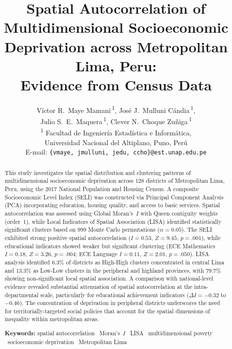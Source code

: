 \documentclass[12pt,a4paper,twoside]{article}
\title{\textbf{Spatial Autocorrelation of Multidimensional Socioeconomic\\Deprivation across Metropolitan Lima, Peru:\\Evidence from Census Data}}
\author{%
  V\'ictor R.\ Maye Mamani\,\textsuperscript{1},
  Jos\'e J.\ Mulluni C\'andia\,\textsuperscript{1},\\[2pt]
  Julio S.\ E.\ Maquera\,\textsuperscript{1},
  Clever N.\ Choque Zu\~niga\,\textsuperscript{1} \\[6pt]
  \small \textsuperscript{1} Facultad de Ingenier\'ia Estad\'istica e Inform\'atica,\\
  \small Universidad Nacional del Altiplano, Puno, Per\'u \\[4pt]
  \small E-mail: \texttt{\{vmaye, jmulluni, jedu, ccho\}@est.unap.edu.pe}
}
\date{}
\begin{document}
\maketitle

\begin{abstract}
\noindent
This study investigates the spatial distribution and clustering patterns of
multidimensional socioeconomic deprivation across 128 districts of Metropolitan
Lima, Peru, using the 2017 National Population and Housing Census. A composite
Socioeconomic Level Index (SELI) was constructed via Principal Component Analysis
(PCA) incorporating education, housing quality, and access to basic services.
Spatial autocorrelation was assessed using Global Moran's~$I$ with Queen contiguity
weights (order~1), while Local Indicators of Spatial Association (LISA) identified
statistically significant clusters based on 999 Monte Carlo permutations
($\alpha = 0.05$). The SELI exhibited strong positive spatial autocorrelation
($I = 0.53$, $Z = 9.45$, $p = .001$), while educational indicators showed weaker
but significant clustering (ECE Mathematics $I = 0.18$, $Z = 3.26$, $p = .004$;
ECE Language $I = 0.11$, $Z = 2.01$, $p = .050$). LISA analysis identified 6.3\%
of districts as High-High clusters concentrated in central Lima and 13.3\% as
Low-Low clusters in the peripheral and highland provinces, with 79.7\% showing
non-significant local spatial association. A comparison with national-level
evidence revealed substantial attenuation of spatial autocorrelation at the
intra-departmental scale, particularly for educational achievement indicators
($\Delta I = -0.32$ to $-0.46$). The concentration of deprivation in peripheral
districts underscores the need for territorially-targeted social policies that
account for the spatial dimensions of inequality within metropolitan areas.

\vspace{6pt}
\noindent\textbf{Keywords:} spatial autocorrelation \textbullet\ Moran's~$I$
\textbullet\ LISA \textbullet\ multidimensional poverty \textbullet\ socioeconomic
deprivation \textbullet\ Metropolitan Lima
\end{abstract}

\newpage

\end{document}
